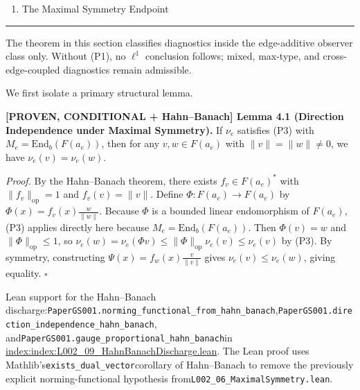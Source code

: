 \documentclass[
  11pt,
]{article}
\providecommand{\tightlist}{%
  \setlength{\itemsep}{0pt}\setlength{\parskip}{0pt}}
\providecommand{\tightlist}{%
  \setlength{\itemsep}{0pt}\setlength{\parskip}{0pt}}
\renewenvironment{quote}
  {\begin{leftbar}\small}
  {\end{leftbar}}
\begin{document}
\begin{enumerate}
\def\labelenumi{\arabic{enumi}.}
\setcounter{enumi}{3}
\tightlist
\item
  The Maximal Symmetry Endpoint
\end{enumerate}

\begin{center}\rule{0.5\linewidth}{0.5pt}\end{center}

The theorem in this section classifies diagnostics inside the edge-additive observer class only. Without (P1), no \(\ell^1\) conclusion follows; mixed, max-type, and cross-edge-coupled diagnostics remain admissible.

We first isolate a primary structural lemma.

\begin{quote}
\textbf{{[}PROVEN, CONDITIONAL + Hahn--Banach{]} Lemma 4.1 (Direction Independence under Maximal Symmetry).} If \(\nu_e\) satisfies (P3) with \(M_e = \mathrm{End}_b(F(a_e))\), then for any \(v, w \in F(a_e)\) with \(\|v\| = \|w\| \neq 0\), we have \(\nu_e(v) = \nu_e(w)\).

\emph{Proof.} By the Hahn--Banach theorem, there exists \(f_v \in F(a_e)^*\) with \(\|f_v\|_{\text{op}} = 1\) and \(f_v(v) = \|v\|\). Define \(\Phi: F(a_e) \to F(a_e)\) by \(\Phi(x) = f_v(x) \frac{w}{\|w\|}\). Because \(\Phi\) is a bounded linear endomorphism of \(F(a_e)\), (P3) applies directly here because \(M_e = \mathrm{End}_b(F(a_e))\). Then \(\Phi(v)=w\) and \(\|\Phi\|_{\text{op}}\le 1\), so \(\nu_e(w)=\nu_e(\Phi v)\le \|\Phi\|_{\text{op}}\nu_e(v)\le \nu_e(v)\) by (P3). By symmetry, constructing \(\Psi(x) = f_w(x) \frac{v}{\|v\|}\) gives \(\nu_e(v) \leq \nu_e(w)\), giving equality. \(\square\)

Lean support for the Hahn--Banach discharge:\texttt{PaperGS001.norming\_functional\_from\_hahn\_banach},\texttt{PaperGS001.direction\_independence\_hahn\_banach}, and\texttt{PaperGS001.gauge\_proportional\_hahn\_banach}in
\href{\%60estate\%20index\%20(see\%20claim\%20ledger;\%20monorepo\%20path\%20omitted\%20for\%20release)\%60}{index:index:L002\_09\_HahnBanachDischarge.lean}. The Lean
proof uses Mathlib's\texttt{exists\_dual\_vector}corollary of Hahn--Banach to remove
the previously explicit norming-functional hypothesis from\texttt{L002\_06\_MaximalSymmetry.lean}.
\end{quote}
\end{document}
